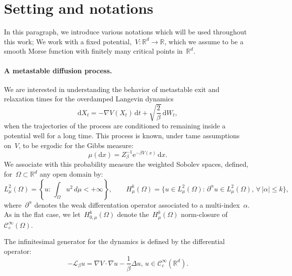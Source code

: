 \documentclass[10pt]{article}
\newcommand{\cL}{\mathcal{L}}
\renewcommand{\d}{\mathrm{d}}
\newcommand{\e}{\mathrm{e}}
\newcommand{\R}{\mathbb{R}}
\newcommand{\1}{\mathbbm 1}
\begin{document}
    \section{Setting and notations}
    \label{sec:notations}
    In this paragraph, we introduce various notations which will be used throughout this work;
    We work with a fixed potential,~$V:\R^d \to \R$, which we assume to be a smooth Morse function with finitely many critical points in~$\R^d$.

    \paragraph{A metastable diffusion process.}
    We are interested in understanding the behavior of metastable exit and relaxation times for the overdamped Langevin dynamics
    \begin{equation}
        \label{eq:overdamped_langevin}
        \d X_t = -\nabla V(X_t)\,\d t + \sqrt{\frac2\beta}\, \d W_t,
    \end{equation}
    when the trajectories of the process are conditioned to remaining inside a potential well for a long time.
    This process is known, under tame assumptions on~$V$, to be ergodic for the Gibbs measure:
    \[\mu(\d x) = Z_\beta^{-1}\e^{-\beta V(x)}\,\d x.\]
    We associate with this probability measure the weighted Sobolev spaces, defined, for~$\Omega\subset \R^d$ any open domain by:
    \begin{equation}
        \label{eq:sobolev_spaces}
        L_\mu^2(\Omega) = \left\{u:\,\int_{\Omega} u^2 \,d\mu < +\infty\right\},\qquad H^{k}_\mu(\Omega) = \{u\in L^2_\mu(\Omega):\,\partial^{\alpha}u\in L^2_\mu(\Omega),\,\forall\, |\alpha|\leq k\},
    \end{equation}
    where~$\partial^\alpha$ denotes the weak differentation operator associated to a multi-index~$\alpha$. As in the flat case, we let~$H_{0,\mu}^k(\Omega)$ denote the~$H_\mu^k(\Omega)$ norm-closure of~$\mathcal C^\infty_c(\Omega)$.

    The infinitesimal generator for the dynamics is defined by the differential operator:
    \begin{equation}
        \label{eq:generator}
        -\cL_\beta u = \nabla V \cdot \nabla u - \frac1\beta \Delta u,\, u \in \mathcal C^\infty_c(\R^d).
    \end{equation}
\end{document}
